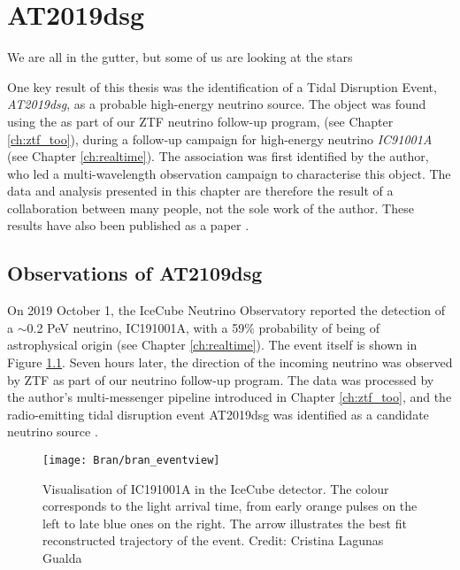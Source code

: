 \setchapterpreamble[u]{\margintoc}
\chapter{AT2019dsg}
\begin{fquote}We are all in the gutter, but some of us are looking at the stars
\end{fquote}

One key result of this thesis was the identification of a Tidal Disruption Event, \emph{AT2019dsg}, as a probable high-energy neutrino source. The object was found using the \ztf{} as part of our ZTF neutrino follow-up program, (see Chapter \ref{ch:ztf_too}), during a follow-up campaign for high-energy neutrino \emph{IC91001A} (see Chapter \ref{ch:realtime}). The association was first identified by the author, who led a multi-wavelength observation campaign to characterise this object. The data and analysis presented in this chapter are therefore the result of a collaboration between many people, not the sole work of the author. These results have also been published as a paper .

\section{Observations of AT2109dsg}
\label{sec:bran_obs}

On 2019 October 1, the IceCube Neutrino Observatory reported the detection of a $\sim$0.2 PeV neutrino, IC191001A, with a 59\% probability of being of astrophysical origin  (see Chapter \ref{ch:realtime}). The event itself is shown in Figure \ref{fig:bran_eventview}. Seven hours later, the direction of the incoming neutrino was observed by ZTF as part of our neutrino follow-up program. The data was processed by the author's multi-messenger pipeline introduced in Chapter \ref{ch:ztf_too}, and the radio-emitting tidal disruption event AT2019dsg was identified as a candidate neutrino source . 

\begin{figure}[!ht]
	\texttt{[image: Bran/bran\_eventview]}
	\caption{Visualisation of IC191001A in the IceCube detector. The colour corresponds to the light arrival time, from early orange pulses on the left to late blue ones on the right. The arrow illustrates the best fit reconstructed trajectory of the event. Credit: Cristina Lagunas Gualda}
	\label{fig:bran_eventview}
\end{figure}

